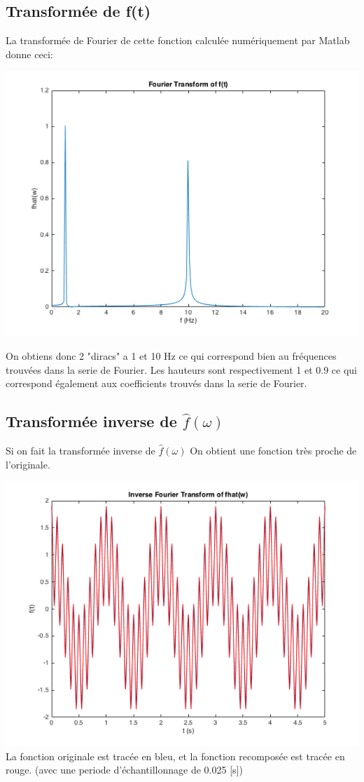 \documentclass[a4paper,11pt]{article}
\begin{document}
\subsection{Transformée de f(t)}
La transformée de Fourier de cette fonction calculée numériquement par Matlab donne ceci: \newline
\begin{center}
\includegraphics[scale=0.6]{"fhat.png"} \newline
\end{center}
On obtiens donc 2 "diracs" a 1 et 10 Hz ce qui correspond bien au fréquences trouvées dans la serie de Fourier. Les hauteurs sont respectivement 1 et 0.9 ce qui correspond également aux coefficients trouvés dans la serie de Fourier.

\subsection{Transformée inverse de $\hat{f}(\omega)$}
Si on fait la transformée inverse de $\hat{f}(\omega)$
On obtient une fonction très proche de l'originale.
\begin{center}
\includegraphics[scale=0.6]{"f_and_f_ifft.png"} \newline
La fonction originale est tracée en bleu, et la fonction recomposée est tracée en rouge. (avec une periode d'échantillonnage de 0.025 [s]) 
\end{center} 
\end{document}
